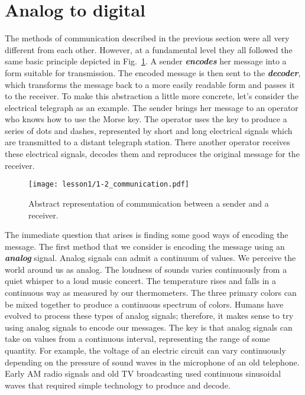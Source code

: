 \section{Analog to digital}


The methods of communication described in the previous section were all very different from each other.
However, at a fundamental level they all followed the same basic principle depicted in Fig.~\ref{fig:1-2_communication}.
A sender \textit{\textbf{encodes}} her message into a form suitable for transmission.
The encoded message is then sent to the \textit{\textbf{decoder}}, which transforms the message back to a more easily readable form and passes it to the receiver.
To make this abstraction a little more concrete, let's consider the electrical telegraph as an example.
The sender brings her message to an operator who knows how to use the Morse key.
The operator uses the key to produce a series of dots and dashes, represented by short and long electrical signals which are transmitted to a distant telegraph station.
There another operator receives these electrical signals, decodes them and reproduces the original message for the receiver.

\begin{figure}[t]
    \centering
    \texttt{[image: lesson1/1-2\_communication.pdf]}
    \caption[Abstraction of communication]{Abstract representation of communication between a sender and a receiver.}
    \label{fig:1-2_communication}
\end{figure}

The immediate question that arises is finding some good ways of encoding the message.
The first method that we consider is encoding the message using an \textit{\textbf{analog}} signal.
Analog signals can admit a continuum of values.
We perceive the world around us as analog.
The loudness of sounds varies continuously from a quiet whisper to a loud music concert.
The temperature rises and falls in a continuous way as measured by our thermometers.
The three primary colors can be mixed together to produce a continuous spectrum of colors.
Humans have evolved to process these types of analog signals; therefore, it makes sense to try using analog signals to encode our messages.
The key is that analog signals can take on values from a continuous interval, representing the range of some quantity.
For example, the voltage of an electric circuit can vary continuously depending on the pressure of sound waves in the microphone of an old telephone.
Early AM radio signals and old TV broadcasting used continuous sinusoidal waves that required simple technology to produce and decode.

